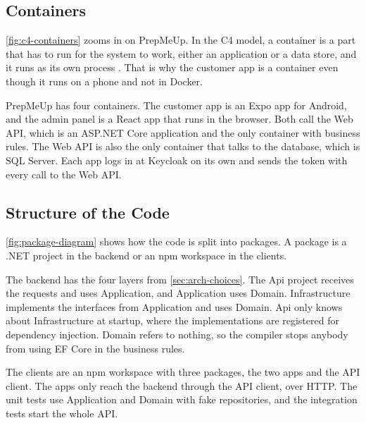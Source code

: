 \subsection{Containers}\label{sec:arch-containers}

\autoref{fig:c4-containers} zooms in on PrepMeUp. In the C4 model, a container is a
part that has to run for the system to work, either an application or a data store,
and it runs as its own process \cite{brown-c4-model}. That is why the customer app is a
container even though it runs on a phone and not in Docker.


PrepMeUp has four containers. The customer app is an Expo app for Android, and the admin
panel is a React app that runs in the browser. Both call the Web API, which is an ASP.NET
Core application and the only container with business rules. The Web API is also the
only container that talks to the database, which is SQL Server. Each app logs in at
Keycloak on its own and sends the token with every call to the Web API.

\subsection{Structure of the Code}\label{sec:arch-packages}

\autoref{fig:package-diagram} shows how the code is split into packages. A package is a
.NET project in the backend or an npm workspace in the clients.


The backend has the four layers from \autoref{sec:arch-choices}. The Api project
receives the requests and uses Application, and Application uses Domain. Infrastructure
implements the interfaces from Application and uses Domain. Api only knows about
Infrastructure at startup, where the implementations are registered for dependency
injection. Domain refers to nothing, so the compiler stops anybody from using EF Core in
the business rules.

The clients are an npm workspace with three packages, the two apps and the API client.
The apps only reach the backend through the API client, over HTTP. The unit tests use
Application and Domain with fake repositories, and the integration tests start the whole
API.

